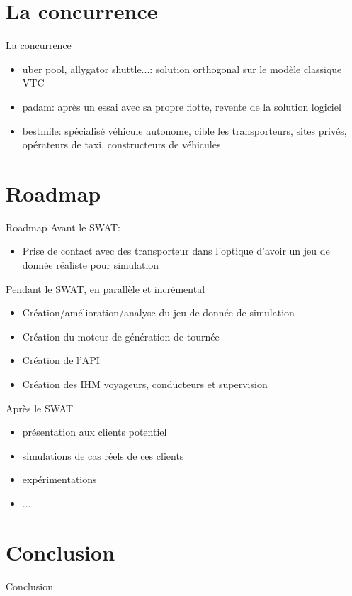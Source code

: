 \documentclass[table]{beamer}
\begin{document}
\section{La concurrence}

\begin{frame}{La concurrence}

  \begin{itemize}
  \item uber pool, allygator shuttle...: solution orthogonal sur le
    modèle classique VTC
  \item padam: après un essai avec sa propre flotte, revente de la
    solution logiciel
  \item bestmile: spécialisé véhicule autonome, cible les
    transporteurs, sites privés, opérateurs de taxi, constructeurs de
    véhicules
  \end{itemize}
\end{frame}

\section{Roadmap}

\begin{frame}{Roadmap}
  Avant le SWAT:
  \begin{itemize}
  \item Prise de contact avec des transporteur dans l'optique d'avoir
    un jeu de donnée réaliste pour simulation
  \end{itemize}

  Pendant le SWAT, en parallèle et incrémental
  \begin{itemize}
  \item Création/amélioration/analyse du jeu de donnée de simulation
  \item Création du moteur de génération de tournée
  \item Création de l'API
  \item Création des IHM voyageurs, conducteurs et supervision
  \end{itemize}
  
  Après le SWAT
  \begin{itemize}
  \item présentation aux clients potentiel
  \item simulations de cas réels de ces clients
  \item expérimentations
  \item ...
  \end{itemize}
\end{frame}

\section{Conclusion}

\begin{frame}{Conclusion}
\end{frame}

\begin{frame}
  \titlepage
\end{frame}
\end{document}
